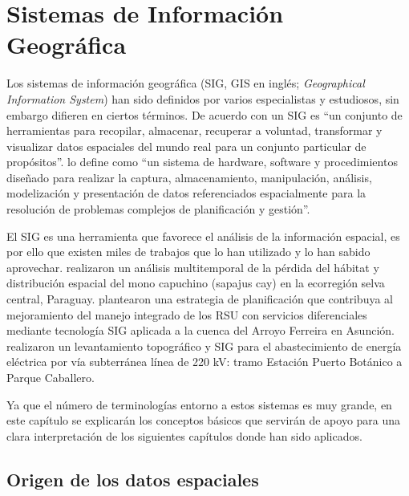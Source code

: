 \chapter{Sistemas de Información Geográfica}
\label{chap3}
\ifpdf
    \graphicspath{{Chapter3/Chapter3Figs/PNG/}{Chapter3/Chapter3Figs/PDF/}{Chapter3/Chapter3Figs/}}
\else
    \graphicspath{{Chapter3/Chapter3Figs/EPS/}{Chapter3/Chapter3Figs/}}
\fi


Los sistemas de información geográfica (SIG, GIS en inglés; \textit{Geographical Information System}) han sido definidos por varios especialistas y estudiosos, sin embargo difieren en ciertos términos. De acuerdo con \citet{Burrough1986PrinciplesAssessment} un SIG es “un conjunto de herramientas para recopilar, almacenar, recuperar a voluntad, transformar y visualizar datos espaciales del mundo real para un conjunto particular de propósitos”. \citet{NCGIA1990IntroductionGIS} lo define como “un sistema de hardware, software y procedimientos diseñado para realizar la captura, almacenamiento, manipulación, análisis, modelización y presentación de datos referenciados espacialmente para la resolución de problemas complejos de planificación y gestión”.

El SIG es una herramienta que favorece el análisis de la información espacial, es por ello que existen miles de trabajos que lo han utilizado y lo han sabido aprovechar. \citet{OsorioDominguez2018AnalisisParaguay} realizaron un análisis multitemporal de la pérdida del hábitat y distribución espacial del mono capuchino (sapajus cay) en la ecorregión selva central, Paraguay. \citet{Cabral2018EstrategiasAsuncion} plantearon una estrategia de planificación que contribuya al mejoramiento del manejo integrado de los RSU con servicios diferenciales mediante tecnología SIG aplicada a la cuenca del Arroyo Ferreira en Asunción. \citet{Acosta2006LevantamientoCaballero} realizaron un levantamiento topográfico y SIG para el abastecimiento de energía eléctrica por vía subterránea línea de 220 kV: tramo Estación Puerto Botánico a Parque Caballero.

Ya que el número de terminologías entorno a estos sistemas es muy grande, en este capítulo se explicarán los conceptos básicos que servirán de apoyo para una clara interpretación de los siguientes capítulos donde han sido aplicados.

\section{Origen de los datos espaciales}

